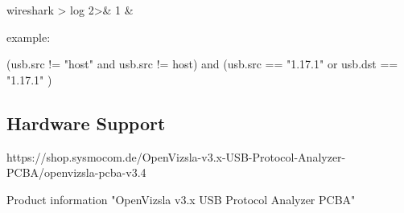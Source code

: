 wireshark > log 2>& 1 &


example:

(usb.src  != "host" and usb.src != host) and (usb.src == "1.17.1" or usb.dst == "1.17.1" )



\subsection{Hardware Support}

https://shop.sysmocom.de/OpenVizsla-v3.x-USB-Protocol-Analyzer-PCBA/openvizsla-pcba-v3.4

Product information "OpenVizsla v3.x USB Protocol Analyzer PCBA"





